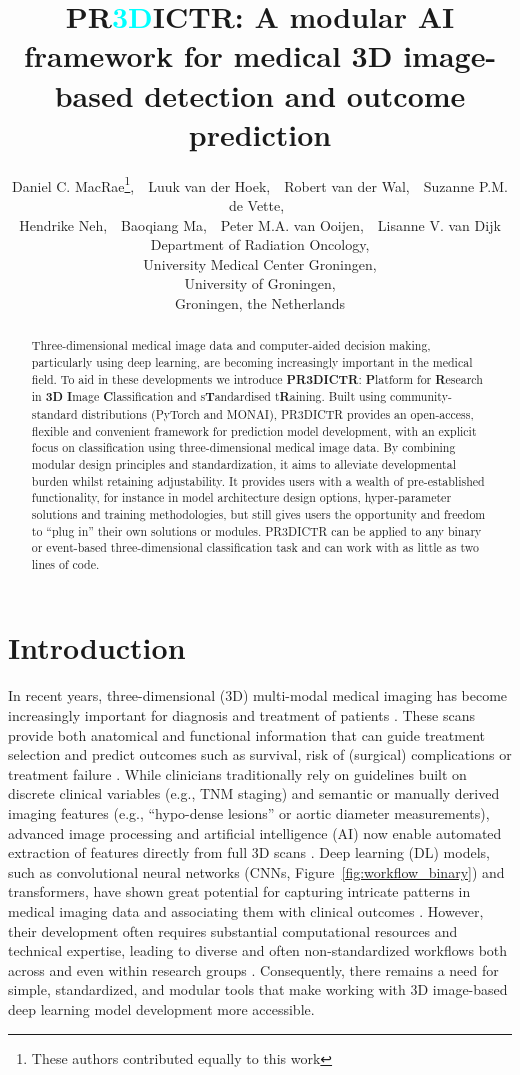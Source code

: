 \documentclass[11pt]{article}
\title{\textbf{PR\textcolor{cyan}{3D}ICTR}: A modular AI framework for medical 3D image-based detection and outcome prediction}
\author{
Daniel C. MacRae\thanks{These authors contributed equally to this work},~\ 
Luuk van der Hoek\footnotemark[1],~\ 
Robert van der Wal,~\
Suzanne P.M. de Vette,~ \\
Hendrike Neh,~\ 
Baoqiang Ma,~\
Peter M.A. van Ooijen,~\ 
Lisanne V. van Dijk \\[0.5em]
\small Department of Radiation Oncology, \\
\small University Medical Center Groningen, \\
\small University of Groningen, \\
\small Groningen, the Netherlands
}
\date{}
\begin{document}
\maketitle

\begin{abstract}
Three-dimensional medical image data and computer-aided decision making, particularly using deep learning, are becoming increasingly important in the medical field. To aid in these developments we introduce \textbf{PR3DICTR}: \textbf{P}latform for \textbf{R}esearch in \textbf{3D} \textbf{I}mage \textbf{C}lassification and s\textbf{T}andardised t\textbf{R}aining. Built using community-standard distributions (PyTorch and MONAI), PR3DICTR provides an open-access, flexible and convenient framework for prediction model development, with an explicit focus on classification using three-dimensional medical image data. By combining modular design principles and standardization, it aims to alleviate developmental burden whilst retaining adjustability. It provides users with a wealth of pre-established functionality, for instance in model architecture design options, hyper-parameter solutions and training methodologies, but still gives users the opportunity and freedom to ``plug in'' their own solutions or modules. PR3DICTR can be applied to any binary or event-based three-dimensional classification task and can work with as little as two lines of code.
\end{abstract}

\section{Introduction}

In recent years, three-dimensional (3D) multi-modal medical imaging has become increasingly important for diagnosis and treatment of patients \cite{Rong2024}. These scans provide both anatomical and functional information that can guide treatment selection and predict outcomes such as survival, risk of (surgical) complications or treatment failure \cite{Vagvala2022,Saba2025}. While clinicians traditionally rely on guidelines built on discrete clinical variables (e.g., TNM staging) and semantic or manually derived imaging features (e.g., ``hypo-dense lesions'' or aortic diameter measurements), advanced image processing and artificial intelligence (AI) now enable automated extraction of features directly from full 3D scans \cite{Aiello2019,vanGalen2025,Huang2024,Erasmus2023,Wehbe2024}. Deep learning (DL) models, such as convolutional neural networks (CNNs, Figure~\ref{fig:workflow_binary}) and transformers, have shown great potential for capturing intricate patterns in medical imaging data and associating them with clinical outcomes \cite{Huang2024,Wehbe2024}. However, their development often requires substantial computational resources and technical expertise, leading to diverse and often non-standardized workflows both across and even within research groups \cite{Pati2023}. Consequently, there remains a need for simple, standardized, and modular tools that make working with 3D image-based deep learning model development more accessible.
\end{document}
